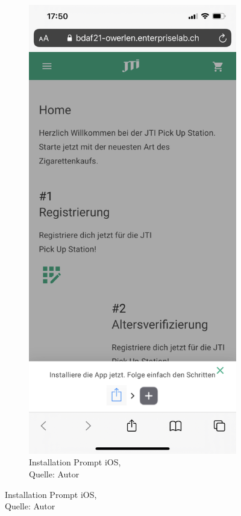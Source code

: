 \begin{figure}[H]
	\begin{subfigure}[b]{0.5\textwidth}
		\includegraphics[scale=0.12]{images/promptIOS.jpeg}
		\caption[Installation Prompt iOS]{Installation Prompt iOS,\\ Quelle: Autor}

\end{subfigure}
\end{figure}

